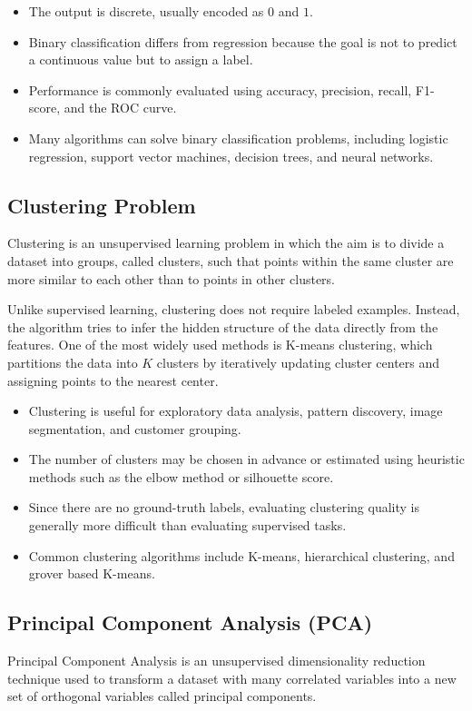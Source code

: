 \documentclass[english,12pt,a4paper]{report}
\begin{document}
	\begin{itemize}
		\item The output is discrete, usually encoded as $0$ and $1$.
		\item Binary classification differs from regression because the goal is not to predict a continuous value but to assign a label.
		\item Performance is commonly evaluated using accuracy, precision, recall, F1-score, and the ROC curve.
		\item Many algorithms can solve binary classification problems, including logistic regression, support vector machines, decision trees, and neural networks.
	\end{itemize}
	
	\subsection{Clustering Problem}
	Clustering is an unsupervised learning problem in which the aim is to divide a dataset into groups, called clusters, such that points within the same cluster are more similar to each other than to points in other clusters.
	
	Unlike supervised learning, clustering does not require labeled examples. Instead, the algorithm tries to infer the hidden structure of the data directly from the features. One of the most widely used methods is K-means clustering, which partitions the data into $K$ clusters by iteratively updating cluster centers and assigning points to the nearest center.
	
	\begin{itemize}
		\item Clustering is useful for exploratory data analysis, pattern discovery, image segmentation, and customer grouping.
		\item The number of clusters may be chosen in advance or estimated using heuristic methods such as the elbow method or silhouette score.
		\item Since there are no ground-truth labels, evaluating clustering quality is generally more difficult than evaluating supervised tasks.
		\item Common clustering algorithms include K-means, hierarchical clustering, and grover based K-means.
	\end{itemize}
	
	\subsection{Principal Component Analysis (PCA)}
	Principal Component Analysis is an unsupervised dimensionality reduction technique used to transform a dataset with many correlated variables into a new set of orthogonal variables called principal components.
	
\end{document}
